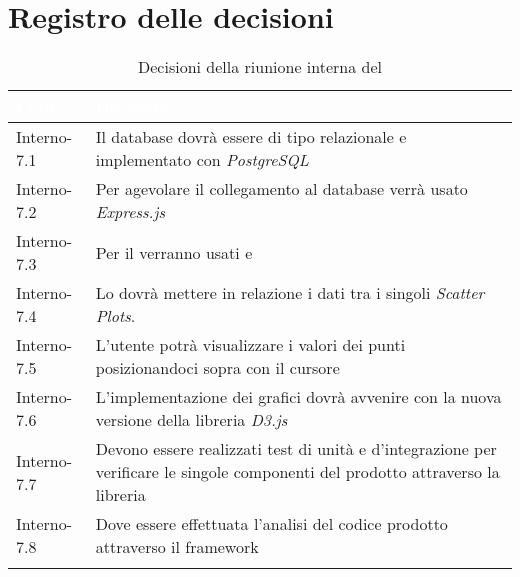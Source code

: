 \section{Registro delle decisioni}
{
\renewcommand{\arraystretch}{1.5}
\centering
\begin{longtable}{C{3cm} C{9cm}}
\textcolor{white}{\textbf{Codice}}&
\textcolor{white}{\textbf{Decisione}}\\	

\endhead
		
Interno-7.1 & Il database dovrà essere di tipo relazionale e implementato con \textit{PostgreSQL}\\
Interno-7.2 & Per agevolare il collegamento al database verrà usato \textit{Express.js}\\
Interno-7.3 & Per il  verranno usati \textit{} e \textit{}\\
Interno-7.4 & Lo \textit{} dovrà mettere in relazione i dati tra i singoli \textit{Scatter Plots}.\\
Interno-7.5 & L'utente potrà visualizzare i valori dei punti posizionandoci sopra con il cursore\\
Interno-7.6 & L'implementazione dei grafici dovrà avvenire con la nuova versione della libreria \textit{D3.js}\\
Interno-7.7 & Devono essere realizzati test di unità e d'integrazione per
verificare le singole componenti del prodotto attraverso la libreria \textit{}\\
Interno-7.8 & Dove essere effettuata l'analisi del codice prodotto attraverso il framework \textit{}\\
\caption{Decisioni della riunione interna del \Data{}}
\end{longtable}
}
